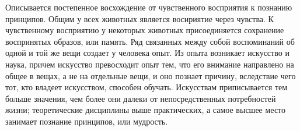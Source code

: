 \documentclass{article}
\begin{document}
Описывается постепенное восхождение от чувственного восприятия к познанию принципов. Общим у всех животных является восириятие через чувства. К чувственному восприятию у некоторых животных присоединяется сохранение воспринятых образов, или память. Ряд связанных между собой воспоминаний об одной и той же вещи создает у человека опыт. Из опыта возникает искусство и наука, причем искусство превосходит опыт тем, что его внимание направлено на общее в вещах, а не на отдельные вещи, и оно познает причину, вследствие чего тот, кто владеет искусством, способен обучать. Искусствам приписывается тем больше значения, чем более они далеки от непосредственных потребностей жизни; теоретические дисциплины выше практических, а самое высшее место занимает познание принципов, или мудрость.
\end{document}
